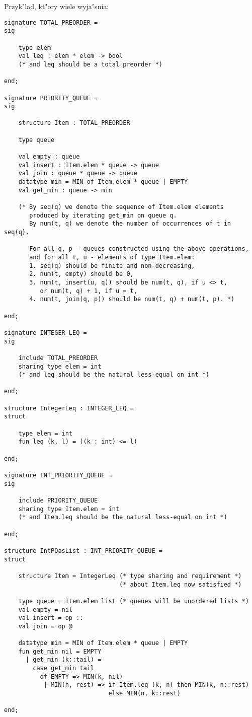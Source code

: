 Przyk"lad, kt"ory wiele wyja"snia:
\begin{verbatim}
signature TOTAL_PREORDER =
sig

    type elem
    val leq : elem * elem -> bool 
    (* and leq should be a total preorder *)

end;

signature PRIORITY_QUEUE =
sig
    
    structure Item : TOTAL_PREORDER

    type queue

    val empty : queue
    val insert : Item.elem * queue -> queue
    val join : queue * queue -> queue 
    datatype min = MIN of Item.elem * queue | EMPTY
    val get_min : queue -> min 

    (* By seq(q) we denote the sequence of Item.elem elements
       produced by iterating get_min on queue q.
       By num(t, q) we denote the number of occurrences of t in seq(q).

       For all q, p - queues constructed using the above operations,
       and for all t, u - elements of type Item.elem:
       1. seq(q) should be finite and non-decreasing,
       2. num(t, empty) should be 0,
       3. num(t, insert(u, q)) should be num(t, q), if u <> t, 
          or num(t, q) + 1, if u = t,
       4. num(t, join(q, p)) should be num(t, q) + num(t, p). *)
    
end;

signature INTEGER_LEQ =
sig

    include TOTAL_PREORDER
    sharing type elem = int
    (* and leq should be the natural less-equal on int *)

end;

structure IntegerLeq : INTEGER_LEQ =
struct

    type elem = int
    fun leq (k, l) = ((k : int) <= l)

end;
    
signature INT_PRIORITY_QUEUE =
sig 

    include PRIORITY_QUEUE
    sharing type Item.elem = int           
    (* and Item.leq should be the natural less-equal on int *)

end;

structure IntPQasList : INT_PRIORITY_QUEUE =
struct

    structure Item = IntegerLeq (* type sharing and requirement *)
                                (* about Item.leq now satisfied *)

    type queue = Item.elem list (* queues will be unordered lists *)
    val empty = nil
    val insert = op ::                            
    val join = op @

    datatype min = MIN of Item.elem * queue | EMPTY
    fun get_min nil = EMPTY
      | get_min (k::tail) = 
        case get_min tail
          of EMPTY => MIN(k, nil)
           | MIN(n, rest) => if Item.leq (k, n) then MIN(k, n::rest)
                             else MIN(n, k::rest)                           

end;
\end{verbatim}

